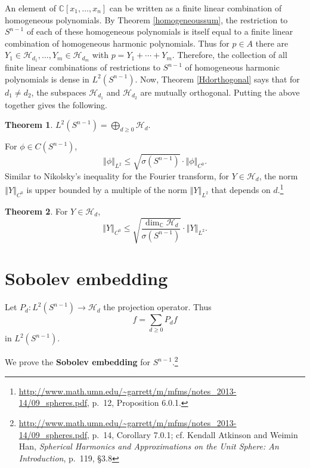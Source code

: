 \documentclass{article}
\newcommand{\norm}[1]{\left\Vert #1 \right\Vert}
\theoremstyle{definition}
\newtheorem{theorem}{Theorem}
\theoremstyle{definition}
\begin{document}
An element of $\mathbb{C}[x_1,\ldots,x_n]$ can be written as a finite linear combination of homogeneous polynomials.
By Theorem \ref{homogeneoussum}, the restriction to $S^{n-1}$ of each of these homogeneous polynomials
is itself equal to a finite linear combination of homogeneous harmonic polynomials. 
Thus for $p \in A$ there are $Y_1 \in \mathscr{H}_{d_1}, \ldots, Y_m \in \mathscr{H}_{d_m}$ with
$p = Y_1 + \cdots + Y_m$. Therefore, the collection of all finite linear combinations of restrictions to $S^{n-1}$
of homogeneous harmonic
polynomials is dense in $L^2(S^{n-1})$.
Now, Theorem \ref{Hdorthogonal} says that for $d_1 \neq d_2$, the subspaces
$\mathscr{H}_{d_1}$ and $\mathscr{H}_{d_2}$ are mutually orthogonal. 
Putting the above together gives the following.

\begin{theorem}
$L^2(S^{n-1}) = \bigoplus_{d \geq 0} \mathscr{H}_d$.
\end{theorem}


For $\phi \in C(S^{n-1})$,  
\[
\norm{\phi}_{L^2} \leq \sqrt{\sigma(S^{n-1})} \cdot \norm{\phi}_{C^0}.
\]
Similar to Nikolsky's inequality for the Fourier transform,
for $Y \in \mathscr{H}_d$,
the norm $\norm{Y}_{C^0}$ is upper bounded by a  multiple of the norm $\norm{Y}_{L^2}$ that depends on $d$.\footnote{\url{http://www.math.umn.edu/~garrett/m/mfms/notes_2013-14/09_spheres.pdf},
p.~12, Proposition 6.0.1.}

\begin{theorem}
For $Y \in \mathscr{H}_d$,
\[
\norm{Y}_{C^0} \leq \sqrt{\frac{\dim_{\mathbb{C}} \mathscr{H}_d}{\sigma(S^{n-1})}} \cdot \norm{Y}_{L^2}.
\]
\label{nikolsky}
\end{theorem}



\section{Sobolev embedding}
Let $P_d:L^2(S^{n-1}) \to \mathscr{H}_d$  the projection operator.
Thus
\[
f = \sum_{d \geq 0} P_d f
\]
in $L^2(S^{n-1})$.

We prove the \textbf{Sobolev embedding} for $S^{n-1}$.\footnote{\url{http://www.math.umn.edu/~garrett/m/mfms/notes_2013-14/09_spheres.pdf},
p.~14, Corollary 7.0.1;
cf. Kendall Atkinson and Weimin Han, {\em Spherical Harmonics and Approximations on the Unit Sphere: An Introduction},
p.~119, \S 3.8}
\end{document}
